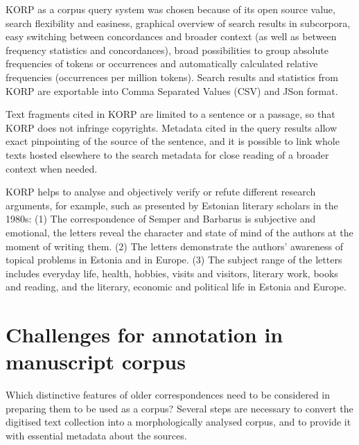 \documentclass[runningheads]{llncs}
\begin{document}
KORP as a corpus query system was chosen because of its open source value, search flexibility and easiness, graphical overview of search results in subcorpora, easy switching between concordances and broader context (as well as between frequency statistics and concordances), broad possibilities to group absolute frequencies of tokens or occurrences and automatically calculated relative frequencies (occurrences per million tokens).  Search results and statistics from KORP are exportable into Comma Separated Values (CSV) and JSon format. 

Text fragments cited in KORP are limited to a sentence or a passage, so that KORP does not infringe copyrights. Metadata cited in the query results allow exact pinpointing of the source of the sentence, and it is possible to link whole texts hosted elsewhere to the search metadata for close reading of a broader context when needed. 

KORP helps to analyse and objectively verify or refute different research arguments, for example, such as presented by Estonian literary scholars in the 1980s:
  (1) The correspondence of Semper and Barbarus is subjective and emotional, the letters reveal the character and state of mind of the authors at the moment of writing them.
(2) The letters demonstrate the authors’ awareness of topical problems in Estonia and in Europe.
 (3) The subject range of the letters includes everyday life, health, hobbies, visits and visitors, literary work, books and reading, and the literary, economic and political life in Estonia and Europe.


\section{Challenges for annotation in manuscript corpus}

Which distinctive features of older correspondences need to be considered in preparing them to be used as a corpus? Several steps are necessary to convert the digitised text collection into a morphologically analysed corpus, and to provide it with essential metadata about the sources.
\end{document}
